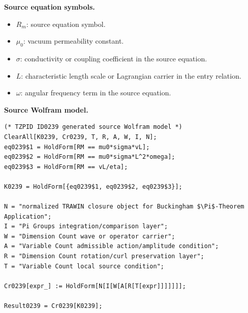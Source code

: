 \begin{minipage}[t]{0.49\linewidth}
\begingroup
\small
\raggedright
\textbf{Source equation symbols.}\par
\begin{itemize}[leftmargin=1.35em,itemsep=1pt,topsep=1pt,parsep=0pt]
    \item $R_m$: source equation symbol.
    \item $\mu_0$: vacuum permeability constant.
    \item $\sigma$: conductivity or coupling coefficient in the source equation.
    \item $L$: characteristic length scale or Lagrangian carrier in the entry relation.
    \item $\omega$: angular frequency term in the source equation.
\end{itemize}
\endgroup
\end{minipage}\hfill
\begin{minipage}[t]{0.47\linewidth}
\begingroup
\scriptsize
\raggedright
\textbf{Source Wolfram model.}\par
\begin{Verbatim}[fontsize=\tiny,breaklines=true,breakanywhere=true]
(* TZPID ID0239 generated source Wolfram model *)
ClearAll[K0239, Cr0239, T, R, A, W, I, N];
eq0239$1 = HoldForm[RM == mu0*sigma*vL];
eq0239$2 = HoldForm[RM == mu0*sigma*L^2*omega];
eq0239$3 = HoldForm[RM == vL/eta];

K0239 = HoldForm[{eq0239$1, eq0239$2, eq0239$3}];

N = "normalized TRAWIN closure object for Buckingham $\Pi$-Theorem Application";
I = "Pi Groups integration/comparison layer";
W = "Dimension Count wave or operator carrier";
A = "Variable Count admissible action/amplitude condition";
R = "Dimension Count rotation/curl preservation layer";
T = "Variable Count local source condition";

Cr0239[expr_] := HoldForm[N[I[W[A[R[T[expr]]]]]]];

Result0239 = Cr0239[K0239];
\end{Verbatim}
\endgroup
\end{minipage}

